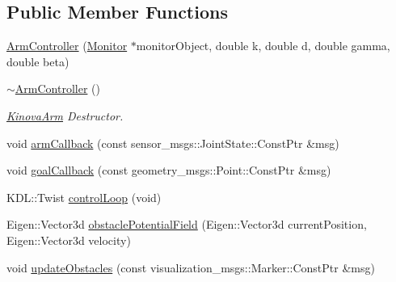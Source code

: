 \subsection*{Public Member Functions}
\begin{DoxyCompactItemize}
\item 
\hyperlink{class_arm_controller_a27a8d755210b8e3bd96217ea8080b327}{Arm\+Controller} (\hyperlink{class_monitor}{Monitor} $\ast$monitor\+Object, double k, double d, double gamma, double beta)
\item 
\hyperlink{class_arm_controller_ad2b44ab21366148d89980e942b26d232}{$\sim$\+Arm\+Controller} ()
\begin{DoxyCompactList}\small\item\em \hyperlink{class_kinova_arm}{Kinova\+Arm} Destructor. \end{DoxyCompactList}\item 
void \hyperlink{class_arm_controller_a29defeb3894d62016523a99b63320a22}{arm\+Callback} (const sensor\+\_\+msgs\+::\+Joint\+State\+::\+Const\+Ptr \&msg)
\item 
void \hyperlink{class_arm_controller_acbd85ddee96c8d6fd76728c68fb12d3c}{goal\+Callback} (const geometry\+\_\+msgs\+::\+Point\+::\+Const\+Ptr \&msg)
\item 
K\+D\+L\+::\+Twist \hyperlink{class_arm_controller_ad7e00a70c968a23087415b1bd0ac8bf1}{control\+Loop} (void)
\item 
Eigen\+::\+Vector3d \hyperlink{class_arm_controller_ad0b1f28333e2a3be76258153a745803d}{obstacle\+Potential\+Field} (Eigen\+::\+Vector3d current\+Position, Eigen\+::\+Vector3d velocity)
\item 
void \hyperlink{class_arm_controller_a17d05bd19286dc4e04355e3d4f6bb372}{update\+Obstacles} (const visualization\+\_\+msgs\+::\+Marker\+::\+Const\+Ptr \&msg)
\end{DoxyCompactItemize}
